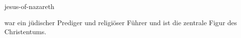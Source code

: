 \documentclass{stex}
\begin{document}
\begin{smodule}[sig=en]{jesus-of-nazareth}
\begin{sparagraph}[style=symdoc]
 war ein jüdischer Prediger
und religiöser Führer und ist die zentrale Figur des Christentums.
\end{sparagraph}
\end{smodule}
\end{document}
